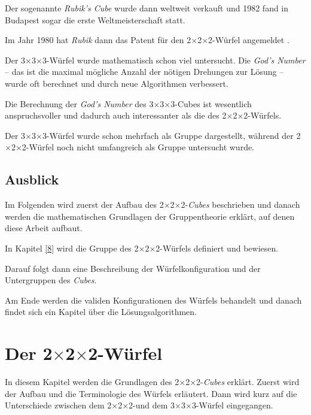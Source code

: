 \documentclass[12pt,a4paper, usenames, dvipsnames]{article}
\newcommand{\Ttwo}{2$\times$2$\times$2-}
\newcommand{\Tthree}{3$\times$3$\times$3-}
\begin{document}
Der sogenannte \textit{Rubik's Cube} wurde dann weltweit verkauft und 1982 fand in Budapest sogar die erste Weltmeisterschaft statt. \cite{RC}

Im Jahr 1980 hat \textit{Rubik} dann das Patent für den \Ttwo Würfel angemeldet \cite{patent}.

\vspace{0.15cm}
Der \Tthree Würfel wurde mathematisch schon viel untersucht. Die \textit{God's Number} -- das ist die maximal mögliche Anzahl der nötigen Drehungen zur Lösung -- wurde oft berechnet und durch neue Algorithmen verbessert. 

Die Berechnung der \textit{God's Number} des \Tthree Cubes ist wesentlich anspruchsvoller und dadurch auch interessanter als die des \Ttwo Würfels. 

Der \Tthree Würfel wurde schon mehrfach als Gruppe dargestellt, während der \Ttwo Würfel
noch nicht umfangreich als Gruppe untersucht wurde.

%
%
%
%
%
%
%
%
\subsection*{Ausblick} 

Im Folgenden wird zuerst der Aufbau des \Ttwo \textit{Cubes} beschrieben und danach werden die mathematischen Grundlagen der Gruppentheorie erklärt, auf denen diese Arbeit aufbaut.

In Kapitel \ref{8} wird die Gruppe des \Ttwo Würfels definiert und bewiesen.

Darauf folgt dann eine Beschreibung der Würfelkonfiguration und der Untergruppen des \textit{Cubes}.

Am Ende werden die validen Konfigurationen des Würfels behandelt und danach findet sich ein Kapitel über die Lösungsalgorithmen.

%
%
%
%
%
%
%
%
%
%
%
%
\newpage
\section{Der \Ttwo Würfel}

In diesem Kapitel werden die Grundlagen des \Ttwo \textit{Cubes} erklärt. Zuerst wird der Aufbau und die Terminologie des Würfels erläutert. Dann wird kurz auf die Unterschiede zwischen dem \Ttwo und dem \Tthree Würfel eingegangen.
\end{document}
